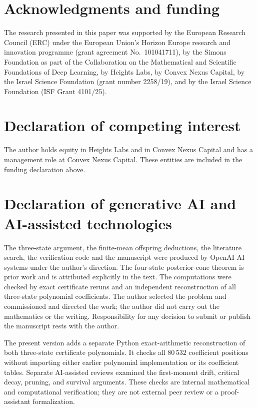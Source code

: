 \section*{Acknowledgments and funding}
The research presented in this paper was supported by the European Research Council (ERC) under the European Union's Horizon Europe research and innovation programme (grant agreement No.~101041711), by the Simons Foundation as part of the Collaboration on the Mathematical and Scientific Foundations of Deep Learning, by Heights Labs, by Convex Nexus Capital, by the Israel Science Foundation (grant number 2258/19), and by the Israel Science Foundation (ISF Grant 4101/25).

\section*{Declaration of competing interest}
The author holds equity in Heights Labs and in Convex Nexus Capital and has a management role at Convex Nexus Capital. These entities are included in the funding declaration above.

\section*{Declaration of generative AI and AI-assisted technologies}
The three-state argument, the finite-mean offspring deductions, the literature search, the verification code and the manuscript were produced by OpenAI AI systems under the author's direction. The four-state posterior-cone theorem is prior work and is attributed explicitly in the text. The computations were checked by exact certificate reruns and an independent reconstruction of all three-state polynomial coefficients. The author selected the problem and commissioned and directed the work; the author did not carry out the mathematics or the writing. Responsibility for any decision to submit or publish the manuscript rests with the author.


The present version adds a separate Python exact-arithmetic reconstruction of both three-state certificate polynomials. It checks all $80\,532$ coefficient positions without importing either earlier polynomial implementation or its coefficient tables. Separate AI-assisted reviews examined the first-moment drift, critical decay, pruning, and survival arguments. These checks are internal mathematical and computational verification; they are not external peer review or a proof-assistant formalization.
